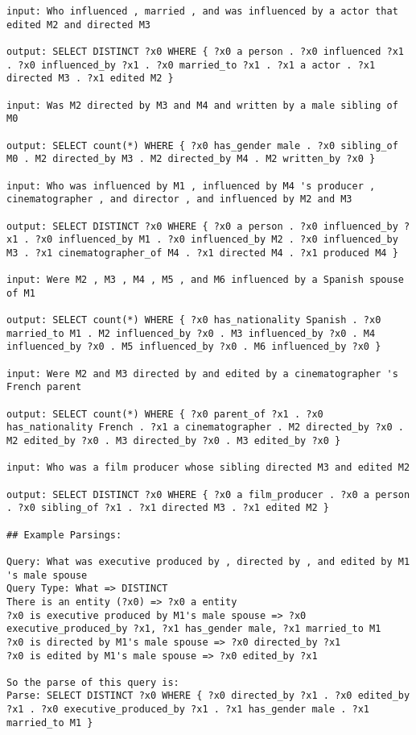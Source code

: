 \documentclass{article} \usepackage{iclr2022_conference,times}
\begin{document}
\begin{lstlisting}
input: Who influenced , married , and was influenced by a actor that edited M2 and directed M3

output: SELECT DISTINCT ?x0 WHERE { ?x0 a person . ?x0 influenced ?x1 . ?x0 influenced_by ?x1 . ?x0 married_to ?x1 . ?x1 a actor . ?x1 directed M3 . ?x1 edited M2 }

input: Was M2 directed by M3 and M4 and written by a male sibling of M0

output: SELECT count(*) WHERE { ?x0 has_gender male . ?x0 sibling_of M0 . M2 directed_by M3 . M2 directed_by M4 . M2 written_by ?x0 }

input: Who was influenced by M1 , influenced by M4 's producer , cinematographer , and director , and influenced by M2 and M3

output: SELECT DISTINCT ?x0 WHERE { ?x0 a person . ?x0 influenced_by ?x1 . ?x0 influenced_by M1 . ?x0 influenced_by M2 . ?x0 influenced_by M3 . ?x1 cinematographer_of M4 . ?x1 directed M4 . ?x1 produced M4 }

input: Were M2 , M3 , M4 , M5 , and M6 influenced by a Spanish spouse of M1

output: SELECT count(*) WHERE { ?x0 has_nationality Spanish . ?x0 married_to M1 . M2 influenced_by ?x0 . M3 influenced_by ?x0 . M4 influenced_by ?x0 . M5 influenced_by ?x0 . M6 influenced_by ?x0 }

input: Were M2 and M3 directed by and edited by a cinematographer 's French parent

output: SELECT count(*) WHERE { ?x0 parent_of ?x1 . ?x0 has_nationality French . ?x1 a cinematographer . M2 directed_by ?x0 . M2 edited_by ?x0 . M3 directed_by ?x0 . M3 edited_by ?x0 }

input: Who was a film producer whose sibling directed M3 and edited M2

output: SELECT DISTINCT ?x0 WHERE { ?x0 a film_producer . ?x0 a person . ?x0 sibling_of ?x1 . ?x1 directed M3 . ?x1 edited M2 }

## Example Parsings:

Query: What was executive produced by , directed by , and edited by M1 's male spouse
Query Type: What => DISTINCT
There is an entity (?x0) => ?x0 a entity
?x0 is executive produced by M1's male spouse => ?x0 executive_produced_by ?x1, ?x1 has_gender male, ?x1 married_to M1
?x0 is directed by M1's male spouse => ?x0 directed_by ?x1
?x0 is edited by M1's male spouse => ?x0 edited_by ?x1

So the parse of this query is:
Parse: SELECT DISTINCT ?x0 WHERE { ?x0 directed_by ?x1 . ?x0 edited_by ?x1 . ?x0 executive_produced_by ?x1 . ?x1 has_gender male . ?x1 married_to M1 }



\end{lstlisting}
\end{document}
